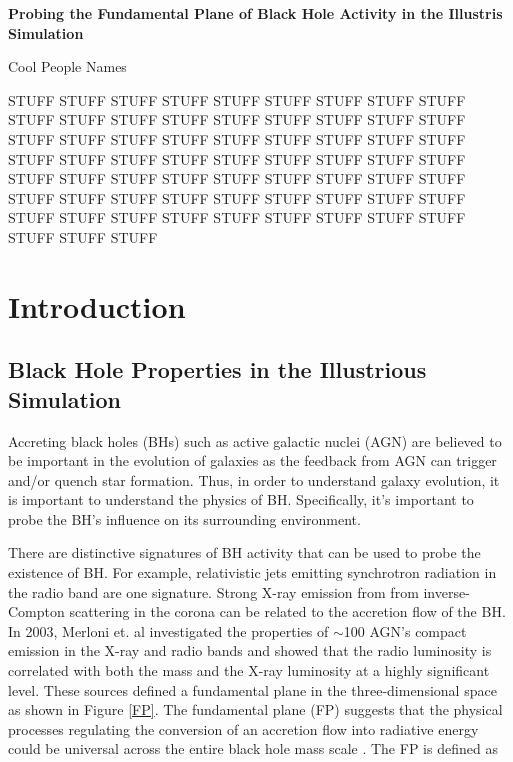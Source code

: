 \documentclass[12pt]{article}
\begin{document}
\setcounter{page}{1}
\centering \LARGE \textbf{Probing the Fundamental Plane of Black Hole Activity in the Illustris Simulation}

\small Cool People Names

\abstract 
\singlespacing 
STUFF STUFF STUFF STUFF STUFF STUFF STUFF STUFF STUFF STUFF STUFF STUFF STUFF STUFF STUFF STUFF STUFF STUFF STUFF STUFF STUFF STUFF STUFF STUFF STUFF STUFF STUFF STUFF STUFF STUFF STUFF STUFF STUFF STUFF STUFF STUFF STUFF STUFF STUFF STUFF STUFF STUFF STUFF STUFF STUFF STUFF STUFF STUFF STUFF STUFF STUFF STUFF STUFF STUFF STUFF STUFF STUFF STUFF STUFF STUFF STUFF STUFF STUFF STUFF STUFF STUFF 

\singlespacing
\section{Introduction}
\subsection{Black Hole Properties in the Illustrious Simulation}
Accreting black holes (BHs) such as active galactic nuclei (AGN) are believed to be important in the evolution of galaxies as the feedback from AGN can trigger and/or quench star formation. Thus, in order to understand galaxy evolution, it is important to understand the physics of BH. Specifically, it's important to probe the BH's influence on its surrounding environment.

There are distinctive signatures of BH activity that can be used to probe the existence of BH. For example, relativistic jets emitting synchrotron radiation in the radio band are one signature. Strong X-ray emission from from inverse-Compton scattering in the corona can be related to the accretion flow of the BH. In 2003, Merloni et. al  investigated the properties of $\sim$100 AGN's compact emission in the X-ray and radio bands and showed that the radio luminosity is correlated with both the mass and the X-ray luminosity at a highly significant level. These sources defined a fundamental plane in the three-dimensional space as shown in Figure \ref{FP}. The fundamental plane (FP) suggests that the physical processes regulating the conversion of an accretion flow into radiative energy could be universal across the entire black hole mass scale \cite{Merloni2003}. The FP is defined as
\end{document}
